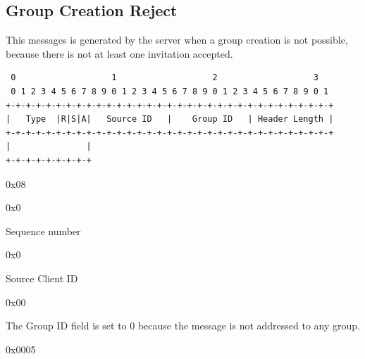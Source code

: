\documentclass{article}
\begin{document}
\subsection{Group Creation Reject}
This messages is generated by the server when a group creation is not possible, because there is not at least one invitation accepted. 
\begin{verbatim}  
 0                   1                   2                   3  
 0 1 2 3 4 5 6 7 8 9 0 1 2 3 4 5 6 7 8 9 0 1 2 3 4 5 6 7 8 9 0 1
+-+-+-+-+-+-+-+-+-+-+-+-+-+-+-+-+-+-+-+-+-+-+-+-+-+-+-+-+-+-+-+-+
|   Type  |R|S|A|   Source ID   |    Group ID   | Header Length |
+-+-+-+-+-+-+-+-+-+-+-+-+-+-+-+-+-+-+-+-+-+-+-+-+-+-+-+-+-+-+-+-+
|               |
+-+-+-+-+-+-+-+-+
\end{verbatim}
\begin{description}[align=left]
    \item [Type:] 0x08
        
    \item [Reserved:] 0x0
        
    \item [Sequence:] Sequence number
    
    \item [Acknowledgement:] 0x0
    
    \item [Source ID:] Source Client ID
        
    \item [Group ID:] 0x00
    \begin{flushleft}
        The Group ID field is set to 0 because the message is not addressed to any group.
    \end{flushleft}
    
    \item [Header Length:] 0x0005
        
\end{description}
\end{document}
